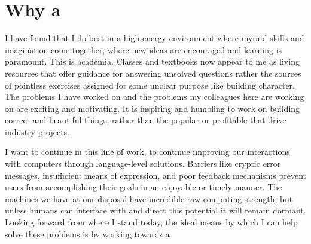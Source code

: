 \documentclass{article}
\begin{document}
\section{Why a \phd}
I have found that I do best in a high-energy environment where myraid skills and imagination come together, where new ideas are encouraged and learning is paramount.
This is academia.
Classes and textbooks now appear to me as living resources that offer guidance for answering unsolved questions rather the sources of pointless exercises assigned for some unclear purpose like building character.
The problems I have worked on and the problems my colleagues here are working on are exciting and motivating.
It is inspiring and humbling to work on building correct and beautiful things, rather than the popular or profitable that drive industry projects.

I want to continue in this line of work, to continue improving our interactions with computers through language-level solutions.
Barriers like cryptic error messages, insufficient means of expression, and poor feedback mechanisms prevent users from accomplishing their goals in an enjoyable or timely manner.
The machines we have at our disposal have incredible raw computing strength, but unless humans can interface with and direct this potential it will remain dormant.
Looking forward from where I stand today, the ideal means by which I can help solve these problems is by working towards a \phd

\end{document}
